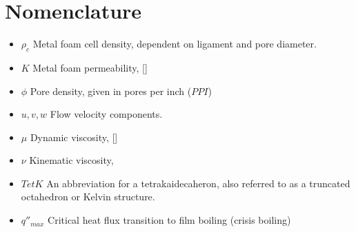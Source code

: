 \documentclass[compileTAMUreport.tex]{subfiles}
\begin{document}
\section{Nomenclature}

\begin{itemize}
\item $\rho_c$ Metal foam cell density, dependent on ligament and pore diameter.
\item $K$ Metal foam permeability, [\metre\squared]
\item $\phi$ Pore density, given in pores per inch ($PPI$) 
\item $u,v,w$ Flow  velocity components.
\item $\mu$ Dynamic viscosity, [\newton\second\per\meter\squared ]
\item $\nu$ Kinematic viscosity, \metre\per\second\squared
\item $TetK$ An abbreviation for a tetrakaidecaheron, also referred to as a truncated octahedron or Kelvin structure.
\item $q''_{max}$ Critical heat flux transition to film boiling (crisis boiling)
\end{itemize}
\end{document}
